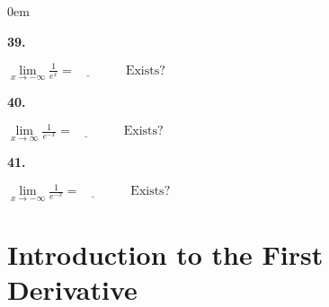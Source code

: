 \documentclass[12pt,]{book}
\theoremstyle{plain}
\theoremstyle{definition}
\numberwithin{equation}{section}
\newenvironment{exercisegroup}%
{\medskip\noindent}%
{\par\bigskip}%
\newlength{\exercisegroupindent}%
\newlength{\exercisegroupitemwidth}%
\newenvironment{exercisegrouplist}%
{\vspace{-\partopsep}%
\begin{adjustwidth}{\exercisegroupindent}{0em}}%
{\end{adjustwidth}%
\vspace{-\partopsep}%
\vspace{\baselineskip}}%
\newenvironment{exercisegroupbycol}[1]%
{\begin{exercisegrouplist}%
\vspace{-\multicolsep}%
\begin{multicols}{#1}%
\setlength{\parindent}{0em}%
\setlength{\exercisegroupitemwidth}{\linewidth}}%
{\end{multicols}%
\vspace{-\multicolsep}%
\end{exercisegrouplist}}%
\newenvironment{exercisegroupitem}[1]%
{\begin{minipage}[t]{\exercisegroupitemwidth}
\vspace{0pt}%
{\bfseries#1}%
\rule{0pt}{\baselineskip}}{\strut%
\end{minipage}%
\hspace{\columnsep}}%
\providecommand\phantomsection{}
\begin{document}
\begin{exercisegroup}
\begin{exercisegroupbycol}{2}
\par%
\begin{exercisegroupitem}{39. }\phantomsection\hypertarget{exercise-176}{\null}
\(\lim\limits_{x\to-\infty}\frac{1}{e^x}=\underline{\qquad}\qquad\text{Exists?}\)%
\end{exercisegroupitem}%
\par%
\begin{exercisegroupitem}{40. }\phantomsection\hypertarget{exercise-177}{\null}
\(\lim\limits_{x\to\infty}\frac{1}{e^{-x}}=\underline{\qquad}\qquad\text{Exists?}\)%
\end{exercisegroupitem}%
\par%
\begin{exercisegroupitem}{41. }\phantomsection\hypertarget{exercise-178}{\null}
\(\lim\limits_{x\to-\infty}\frac{1}{e^{-x}}=\underline{\qquad}\qquad\text{Exists?}\)%
\end{exercisegroupitem}%
\par%
\end{exercisegroupbycol}%
\end{exercisegroup}%
\typeout{************************************************}
\typeout{************************************************}
\chapter[Introduction to the First Derivative]{Introduction to the First Derivative}\label{chapter-introduction-first-derivative}
\typeout{************************************************}
\typeout{************************************************}
\end{document}
